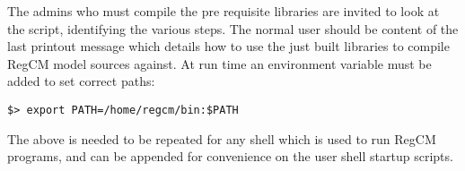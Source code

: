 The admins who must compile the pre requisite libraries are invited to look
at the script, identifying the various steps.
The normal user should be content of the last printout message which details
how to use the just built libraries to compile RegCM model sources against.
At run time an environment variable must be added to set correct paths:

\begin{Verbatim}
$> export PATH=/home/regcm/bin:$PATH
\end{Verbatim}

The above is needed to be repeated for any shell which is used to run
RegCM programs, and can be appended for convenience on the user shell
startup scripts.
